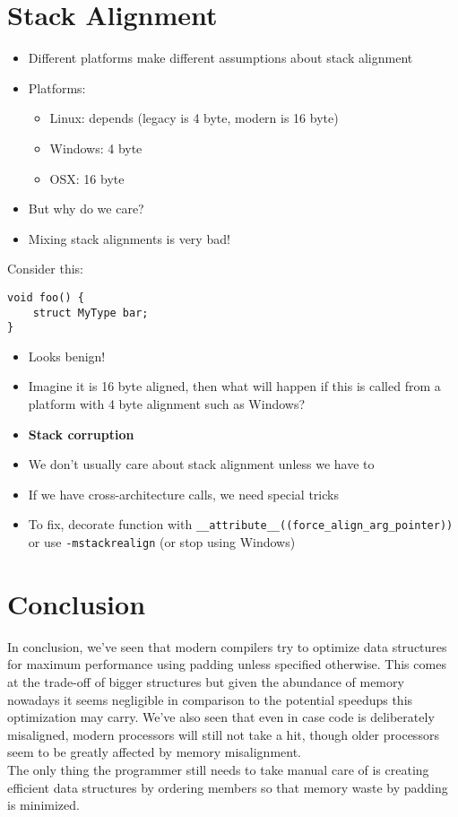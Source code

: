 \documentclass[a4paper,12pt]{scrartcl}
\begin{document}
\section{Stack Alignment}
\begin{itemize}
    \item Different platforms make different assumptions about stack alignment
    \item Platforms:
        \begin{itemize}
            \item Linux: depends (legacy is 4 byte, modern is 16 byte)
            \item Windows: 4 byte
            \item OSX: 16 byte
        \end{itemize}
    \item But why do we care?
    \item Mixing stack alignments is very bad!
\end{itemize}

Consider this:
\begin{verbatim}
void foo() {
    struct MyType bar;
}
\end{verbatim}
\begin{itemize}
    \item Looks benign!
    \item Imagine it is 16 byte aligned, then what will happen if this is called from a
        platform with 4 byte alignment such as Windows?
    \item \textbf{Stack corruption}
\end{itemize}

\begin{itemize}
    \item We don't usually care about stack alignment unless we have to
    \item If we have cross-architecture calls, we need special tricks
    \item To fix, decorate function with \verb|__attribute__((force_align_arg_pointer))| or use
        \verb|-mstackrealign| (or stop using Windows)
\end{itemize}

\section{Conclusion}
In conclusion, we've seen that modern compilers try to optimize data structures for maximum
performance using padding unless specified otherwise. This comes at the trade-off of bigger structures but given
the abundance of memory nowadays it seems negligible in comparison to the potential speedups this
optimization may carry. We've also seen that even in case code is deliberately misaligned, modern
processors will still not take a hit, though older processors seem to be greatly affected by memory
misalignment.
\\
The only thing the programmer still needs to take manual care of is creating efficient data structures by
ordering members so that memory waste by padding is minimized.


\begin{thebibliography}{9}
\end{thebibliography}
\end{document}
